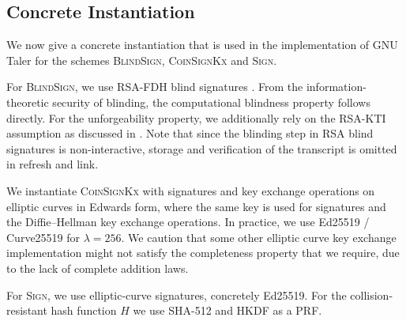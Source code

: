 \subsection{Concrete Instantiation}
We now give a concrete instantiation that is used in the implementation
of GNU Taler for the schemes \textsc{BlindSign}, \textsc{CoinSignKx} and \textsc{Sign}.

For \textsc{BlindSign}, we use RSA-FDH blind signatures
\cite{chaum1983blind,bellare1996exact}.  From the information-theoretic
security of blinding, the computational blindness property follows directly.  For
the unforgeability property, we additionally rely on the RSA-KTI assumption as
discussed in \cite{bellare2003onemore}.  Note that since the blinding step in
RSA blind signatures is non-interactive, storage and verification of the
transcript is omitted in refresh and link.

We instantiate \textsc{CoinSignKx} with signatures and key exchange operations
on elliptic curves in Edwards form, where the same key is used for signatures
and the Diffie--Hellman key exchange operations.  In practice, we use Ed25519
\cite{bernstein2012high} / Curve25519 \cite{bernstein2006curve25519} for
$\lambda=256$.  We caution that some other elliptic curve key exchange
implementation might not satisfy the completeness property that we require, due
to the lack of complete addition laws.

For \textsc{Sign}, we use elliptic-curve signatures, concretely Ed25519.  For
the collision-resistant hash function $H$ we use SHA-512 \cite{rfc4634} and
HKDF \cite{rfc5869} as a PRF.

%



